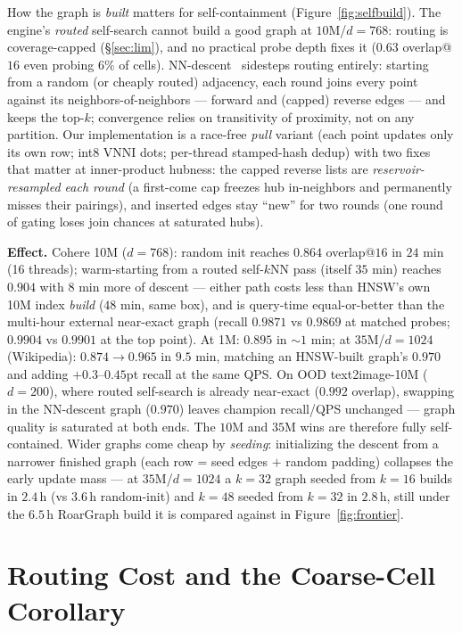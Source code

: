 \documentclass{article}
\newcommand{\effect}[1]{\par\smallskip\noindent\textbf{Effect.} #1}
\begin{document}
 How the graph is \emph{built}
matters for self-containment (Figure~\ref{fig:selfbuild}). The engine's \emph{routed} self-search cannot build a good
graph at $10$M/$d{=}768$: routing is coverage-capped (\S\ref{sec:lim}), and no practical
probe depth fixes it ($0.63$ overlap@$16$ even probing $6\%$ of cells). NN-descent~\cite{nndescent}
sidesteps routing entirely: starting from a random (or cheaply routed) adjacency, each round
joins every point against its neighbors-of-neighbors --- forward and (capped) reverse edges ---
and keeps the top-$k$; convergence relies on transitivity of proximity, not on any partition.
Our implementation is a race-free \emph{pull} variant (each point updates only its own row;
int8 VNNI dots; per-thread stamped-hash dedup) with two fixes that matter at inner-product
hubness: the capped reverse lists are \emph{reservoir-resampled each round} (a first-come cap
freezes hub in-neighbors and permanently misses their pairings), and inserted edges stay
``new'' for two rounds (one round of gating loses join chances at saturated hubs).
\effect{Cohere 10M ($d{=}768$): random init reaches $0.864$ overlap@$16$ in $24$ min
(16 threads); warm-starting from a routed self-$k$NN pass (itself $35$ min) reaches
$\mathbf{0.904}$ with $8$ min more of descent --- either path costs less than HNSW's own
10M index \emph{build} ($48$ min, same box), and is query-time equal-or-better than the multi-hour external
near-exact graph (recall $0.9871$ vs $0.9869$ at matched probes; $0.9904$ vs $0.9901$ at the
top point). At 1M: $0.895$ in ${\sim}1$ min; at $35$M/$d{=}1024$ (Wikipedia): $0.874\to0.965$
in $9.5$ min, matching an HNSW-built graph's $0.970$ and adding $+0.3$--$0.45$pt recall at the same
QPS. On OOD text2image-10M ($d{=}200$), where routed self-search is already near-exact
($0.992$ overlap), swapping in the NN-descent graph ($0.970$) leaves champion recall/QPS unchanged
--- graph quality is saturated at both ends. The $10$M and $35$M wins are therefore fully
self-contained. Wider graphs come cheap by \emph{seeding}: initializing the descent from a
narrower finished graph (each row = seed edges $+$ random padding) collapses the early update
mass --- at $35$M/$d{=}1024$ a $k{=}32$ graph seeded from $k{=}16$ builds in $2.4$\,h (vs
$3.6$\,h random-init) and $k{=}48$ seeded from $k{=}32$ in $2.8$\,h, still under the $6.5$\,h
RoarGraph build it is compared against in Figure~\ref{fig:frontier}.}

\section{Routing Cost and the Coarse-Cell Corollary}
\label{sec:coarse}
\end{document}
